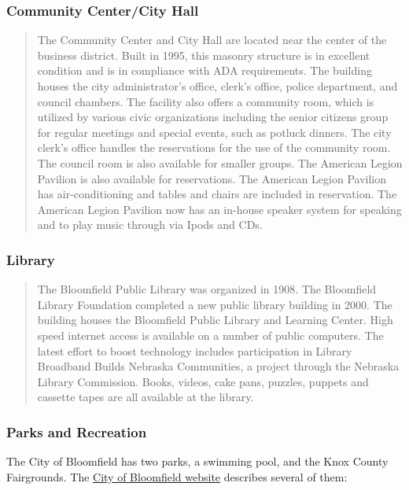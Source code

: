 \subsubsection*{Community Center/City Hall}

\begin{quote}
    The Community Center and City Hall are located near the center of the business district. Built in 1995, this masonry structure is in excellent condition and is in compliance with ADA requirements. The building houses the city administrator’s office, clerk’s office, police department, and council chambers. The facility also offers a community room, which is utilized by various civic organizations including the senior citizens group for regular meetings and special events, such as potluck dinners. The city clerk’s office handles the reservations for the use of the community room.  The council room is also available for smaller groups. The American Legion Pavilion is also available for reservations. The American Legion Pavilion has air-conditioning and tables and chairs are included in reservation. The American Legion Pavilion now has an in-house speaker system for speaking and to play music through via Ipods and CDs.
\end{quote}

\subsubsection*{Library}

\begin{quote}
    The Bloomfield Public Library was organized in 1908. The Bloomfield Library Foundation completed a new public library building in 2000. The building houses the Bloomfield Public Library and Learning Center. High speed internet access is available on a number of public computers. The latest effort to boost technology includes participation in Library Broadband Builds Nebraska Communities, a project through the Nebraska Library Commission. Books, videos, cake pans, puzzles, puppets and cassette tapes are all available at the library.
\end{quote}

\pagebreak
\subsubsection*{Parks and Recreation}

\noindent The City of Bloomfield has two parks, a swimming pool, and the Knox County Fairgrounds. The \href{https://bloomfieldnebraska.com/our-recreation/}{City of Bloomfield website} describes several of them:

